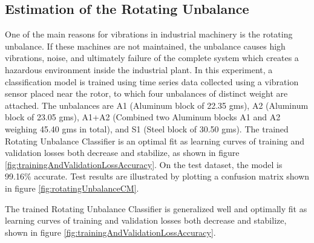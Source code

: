 \documentclass[
  manuscript=report,  %
  layout=preprint,  %
  year=20xx,
  volume=x,
]{extra/joas}
\begin{document}
\subsection{Estimation of the Rotating Unbalance}

One of the main reasons for vibrations in industrial machinery is the rotating unbalance. If these machines are not maintained, the unbalance causes high vibrations, noise, and ultimately failure of the complete system which creates a hazardous environment inside the industrial plant. In this experiment, a classification model is trained using time series data collected using a vibration sensor placed near the rotor, to which four unbalances of distinct weight are attached. The unbalances are A1 (Aluminum block of 22.35 gms), A2 (Aluminum block of 23.05 gms), A1+A2 (Combined two Aluminum blocks A1 and A2 weighing 45.40 gms in total), and S1 (Steel block of 30.50 gms). The trained Rotating Unbalance Classifier is an optimal fit as learning curves of training and validation losses both decrease and stabilize, as shown in figure \ref{fig:trainingAndValidationLossAccuracy}. On the test dataset, the model is 99.16\% accurate. Test results are illustrated by plotting a confusion matrix shown in figure \ref{fig:rotatingUnbalanceCM}.


The trained Rotating Unbalance Classifier is generalized well and optimally fit as learning curves of training and validation losses both decrease and stabilize, shown in figure \ref{fig:trainingAndValidationLossAccuracy}.
 
\end{document}
